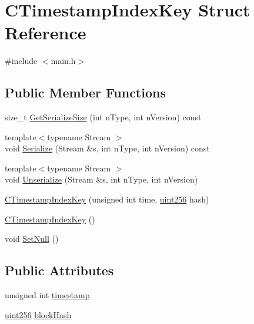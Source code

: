 \hypertarget{struct_c_timestamp_index_key}{}\section{C\+Timestamp\+Index\+Key Struct Reference}
\label{struct_c_timestamp_index_key}


{\ttfamily \#include $<$main.\+h$>$}

\subsection*{Public Member Functions}
\begin{DoxyCompactItemize}
\item 
size\+\_\+t \mbox{\hyperlink{struct_c_timestamp_index_key_a8275de5b4b5eb9a5afaf2921a139e0eb}{Get\+Serialize\+Size}} (int n\+Type, int n\+Version) const
\item 
{\footnotesize template$<$typename Stream $>$ }\\void \mbox{\hyperlink{struct_c_timestamp_index_key_af08cb17ed40232b5708b862f86aaffec}{Serialize}} (Stream \&s, int n\+Type, int n\+Version) const
\item 
{\footnotesize template$<$typename Stream $>$ }\\void \mbox{\hyperlink{struct_c_timestamp_index_key_aeafbd5739644dd4fdbc5d608cca05bd3}{Unserialize}} (Stream \&s, int n\+Type, int n\+Version)
\item 
\mbox{\hyperlink{struct_c_timestamp_index_key_ad8bd13300b5215fba9daad2311ecf606}{C\+Timestamp\+Index\+Key}} (unsigned int time, \mbox{\hyperlink{classuint256}{uint256}} hash)
\item 
\mbox{\hyperlink{struct_c_timestamp_index_key_ab4fa0901e2a40c9aad213532c16666df}{C\+Timestamp\+Index\+Key}} ()
\item 
void \mbox{\hyperlink{struct_c_timestamp_index_key_a022b090d576c984bcdf6934608c58ba6}{Set\+Null}} ()
\end{DoxyCompactItemize}
\subsection*{Public Attributes}
\begin{DoxyCompactItemize}
\item 
unsigned int \mbox{\hyperlink{struct_c_timestamp_index_key_ad8558ff210c520bb1a0ff41c0ccd6867}{timestamp}}
\item 
\mbox{\hyperlink{classuint256}{uint256}} \mbox{\hyperlink{struct_c_timestamp_index_key_a283807e42c308d1998b226ec30352239}{block\+Hash}}
\end{DoxyCompactItemize}


